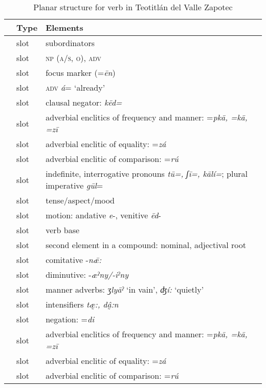 \documentclass[output=paper]{langscibook}
\begin{document}
\begin{table}[p]
    \label{tab:planarvzap}
    \caption{Planar structure for verb in Teotitlán del Valle Zapotec}
    \begin{tabular}{Slp{9cm}}
    \lsptoprule
{} & Type & Elements\\ \midrule
\label{zsub1} & slot & subordinators\\
\label{znp2} & slot & \textsc{np} \textsc{(a/s,} \textsc{o}), \textsc{adv}\\
\label{zfoc3} & slot & focus marker (=\textit{ēn})\\
\label{zadv4} & slot & \textsc{adv} \textit{á}= `already'\\
\label{zneg5} & slot & clausal negator: \textit{kēd=}\\
\label{zadv6} & slot & adverbial enclitics of frequency and manner: =\textit{pkā, =kā, =zī}\\
\label{zadv7} & slot & adverbial enclitic of equality: =\textit{zá}\\
\label{zadv8} & slot & adverbial enclitic of comparison: =\textit{rú}\\
\label{zind9} & slot & indefinite, interrogative pronouns \textit{tū=, ʃī=, kālí=}; plural imperative \textit{gūl}= \\
\label{ztam10} & slot & tense/aspect/mood\\
\label{zmot11} & slot & motion: andative \textit{e}-, venitive \textit{ēd}-\\
\label{zbase12} & slot & verb base\\
\label{zcomp13} & slot & second element in a compound: nominal, adjectival root\\
\label{zcom14} & slot & comitative -\textit{nǣ:}\\
\label{zdim15} & slot & diminutive: -\textit{æˀny/-iˀny}\\
\label{zman16} & slot & manner adverbs: \textit{ʒlyāˀ} `in vain', \textit{ʤí:} `quietly'\\
\label{zint17} & slot & intensifiers \textit{tæ̰:, dâ̰:n}\\
\label{zneg18} & slot & negation: =\textit{di}\\
\label{zadv19} & slot & adverbial enclitics of frequency and manner: =\textit{pkā, =kā, =zī}\\
\label{zadv20} & slot & adverbial enclitic of equality: =\textit{zá}\\
\label{zadv21} & slot & adverbial enclitic of comparison: =\textit{rú}\\

\end{tabular}
\end{table}
\end{document}
